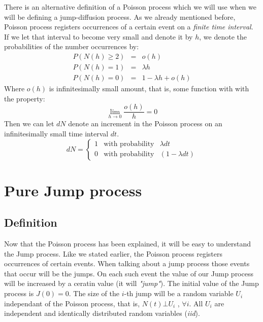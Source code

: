 \documentclass[times, utf8, diplomski]{fer}
\begin{document}
		\noindent There is an alternative definition of a Poisson process which we will use when we will be defining a jump-diffusion process. As we already mentioned before, Poisson process registers occurrences of a certain event on a \textit{finite time interval}. If we let that interval to become very small and denote it by $h$, we denote the probabilities of the number occurrences by: 
		\begin{equation}
			\begin{array}{rcl}
				P(N(h) \geq 2) &\mbox{=}& o(h) \\
				P(N(h) = 1) &\mbox{=}& \lambda h \\
				P(N(h) = 0) &\mbox{=}& 1 - \lambda h + o(h)
			\end{array}
		\end{equation}
		Where $o(h)$ is infinitesimally small amount, that is, some function with with the property: \begin{equation} \lim_{h \to 0} \frac{o(h)}{h} = 0 \end{equation} Then we can let $dN$ denote an increment in the Poisson process on an infinitesimally small time interval $dt$. 
		\begin{equation} 
			dN = \left\{  \begin{array}{lcl} 1 & \mbox{with probability} & \lambda dt \\
																	0 & \mbox{with probability} & (1 - \lambda dt) \end{array} \right.
		\end{equation}
	
	\section{Pure Jump process}
		\subsection{Definition}
		Now that the Poisson process has been explained, it will be easy to understand the Jump process. Like we stated earlier, the Poisson process registers occurrences of certain events. When talking about a jump process those events that occur will be the jumps. On each such event the value of our Jump process will be increased by a ceratin value (it will \textit{"jump"}). The initial value of the Jump process is $J(0) = 0$. The size of the $i$-th jump will be a random variable $U_i$ independant of the Poisson process, that is, $N(t) \bot U_i$ , $\forall i$. All $U_i$ are independent and identically distributed random variables (\textit{iid}).
\end{document}
